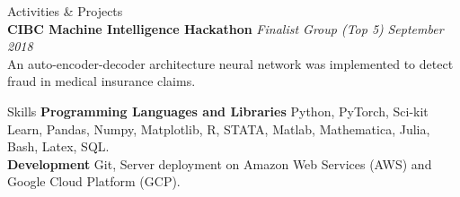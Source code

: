 \documentclass{resume} %
\begin{document}
\begin{rSection}{Activities \& Projects}
\\{\bf CIBC Machine Intelligence Hackathon} \emph{Finalist Group (Top 5)} \hfill \emph{September 2018}
\\
An auto-encoder-decoder architecture neural network was implemented to detect fraud in medical insurance claims.
\\

\end{rSection}

\begin{rSection}{Skills}
\textbf{Programming Languages and Libraries} Python, PyTorch, Sci-kit Learn, Pandas, Numpy, Matplotlib, R, STATA, Matlab, Mathematica, Julia, Bash, Latex, SQL.
\\\textbf{Development} Git, Server deployment on Amazon Web Services (AWS) and Google Cloud Platform (GCP).
\end{rSection}


\end{document}
